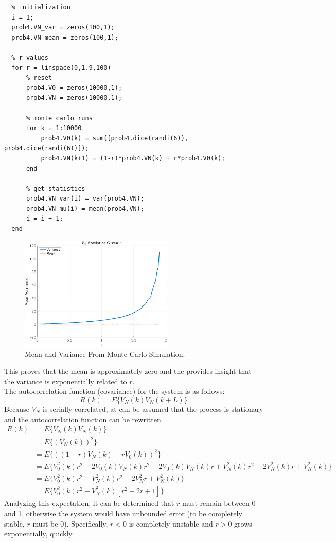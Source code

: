 \documentclass[11pt]{article}
\begin{document}
\begin{enumerate}[label=\textbf{\arabic*.}]
\begin{lstlisting}
  % initialization
  i = 1;
  prob4.VN_var = zeros(100,1);
  prob4.VN_mean = zeros(100,1);

  % r values
  for r = linspace(0,1.9,100)
      % reset
      prob4.V0 = zeros(10000,1);
      prob4.VN = zeros(10000,1);

      % monte carlo runs
      for k = 1:10000
          prob4.V0(k) = sum([prob4.dice(randi(6)), prob4.dice(randi(6))]);
          prob4.VN(k+1) = (1-r)*prob4.VN(k) + r*prob4.V0(k);
      end
      
      % get statistics
      prob4.VN_var(i) = var(prob4.VN);
      prob4.VN_mu(i) = mean(prob4.VN);
      i = i + 1;
  end
  \end{lstlisting}
  \begin{figure}[H]
    \centering
    \includegraphics[width=0.65\textwidth]{p4.png}
    \caption{Mean and Variance From Monte-Carlo Simulation.}
  \end{figure}
  This proves that the mean is approximately zero and the provides insight 
  that the variance is exponentially related to $r$. \\
  The autocorrelation function (covariance) for the system is as follows:
  \begin{equation*}
    R(k) = E\{V_N(k)V_N(k+L)\}
  \end{equation*}
  Because $V_N$ is serially correlated, at can be assumed that the process 
  is stationary and the autocorrelation function can be rewritten.
  \begin{equation*}
    \begin{split}
      R(k) &= E\{V_N(k)V_N(k)\} \\
      &= E\{(V_N(k))^2\} \\
      &= E\{((1-r)V_N(k)+rV_0(k))^2\} \\
      &= E\{V_0^2(k)r^2 - 2V_0(k)V_N(k)r^2 + 2V_0(k)V_N(k)r + V_N^2(k)r^2 - 2V_N^2(k)r + V_N^2(k)\} \\
      &= E\{V_0^2(k)r^2 + V_N^2(k)r^2 - 2V_N^2r + V_N^2(k)\} \\
      &= E\{V_0^2(k)r^2 + V_N^2(k)[r^2 - 2r + 1]\}
    \end{split}
  \end{equation*}
  Analyzing this expectation, it can be determined that $r$ must remain 
  between 0 and 1, otherwise the system would have unbounded error 
  (to be completely stable, $r$ must be 0). Specifically, $r<0$ is 
  completely unstable and $r>0$ grows exponentially, quickly.


\end{enumerate}
\end{document}
